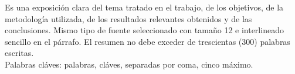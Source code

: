 \documentclass[pregrado]{tesis-usb}
\begin{document}
\frontmatter
\maketitle


\begin{resumen}
     Es una exposici\'on clara del tema tratado en el trabajo, de los objetivos, de la metodolog\'ia utilizada, de los resultados relevantes obtenidos y de las conclusiones. Mismo tipo de fuente seleccionado con tamaño 12 e interlineado sencillo en el p\'arrafo. El resumen no debe exceder de trescientas (300) palabras escritas. \\
     Palabras cl\'aves: palabras, cl\'aves, separadas por coma, cinco m\'aximo.
\end{resumen}
\tableofcontents
\listoffigures
\listoftables
\useacronyms


\mainmatter





\nocite{*}

\appendix


\end{document}
